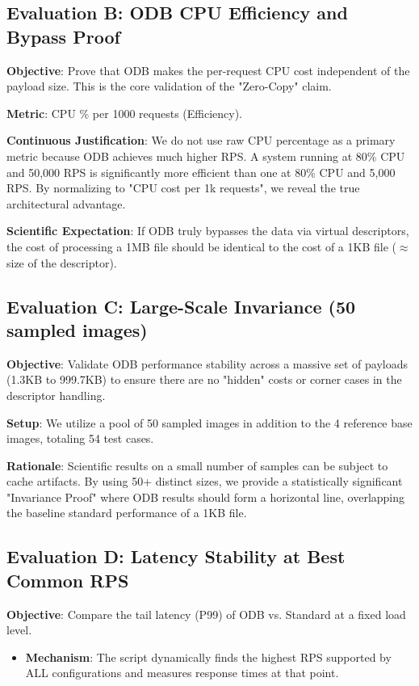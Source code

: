 \documentclass[a4paper,12pt]{article}
\begin{document}
\subsection{Evaluation B: ODB CPU Efficiency and Bypass Proof}
\textbf{Objective}: Prove that ODB makes the per-request CPU cost independent of the payload size. This is the core validation of the "Zero-Copy" claim.

\textbf{Metric}: CPU \% per 1000 requests (Efficiency).

\textbf{Continuous Justification}: We do not use raw CPU percentage as a primary metric because ODB achieves much higher RPS. A system running at 80\% CPU and 50,000 RPS is significantly more efficient than one at 80\% CPU and 5,000 RPS. By normalizing to "CPU cost per 1k requests", we reveal the true architectural advantage.

\textbf{Scientific Expectation}: If ODB truly bypasses the data via virtual descriptors, the cost of processing a 1MB file should be identical to the cost of a 1KB file ($\approx$ size of the descriptor).

\subsection{Evaluation C: Large-Scale Invariance (50 sampled images)}
\textbf{Objective}: Validate ODB performance stability across a massive set of payloads (1.3KB to 999.7KB) to ensure there are no "hidden" costs or corner cases in the descriptor handling.

\textbf{Setup}: We utilize a pool of 50 sampled images in addition to the 4 reference base images, totaling 54 test cases.

\textbf{Rationale}: Scientific results on a small number of samples can be subject to cache artifacts. By using 50+ distinct sizes, we provide a statistically significant "Invariance Proof" where ODB results should form a horizontal line, overlapping the baseline standard performance of a 1KB file.

\subsection{Evaluation D: Latency Stability at Best Common RPS}
\textbf{Objective}: Compare the tail latency (P99) of ODB vs. Standard at a fixed load level.
\begin{itemize}
    \item \textbf{Mechanism}: The script dynamically finds the highest RPS supported by ALL configurations and measures response times at that point.
\end{itemize}
\end{document}
